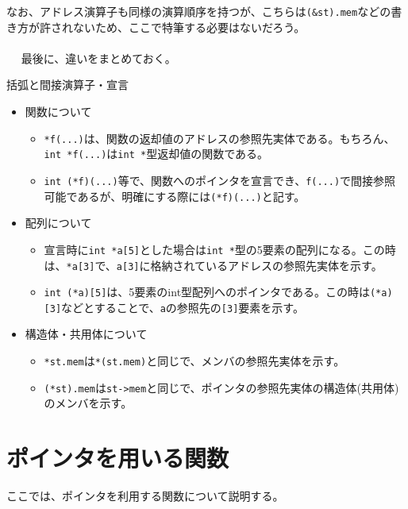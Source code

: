 なお、アドレス演算子も同様の演算順序を持つが、こちらは\verb|(&st).mem|などの書き方が許されないため、ここで特筆する必要はないだろう。
\\ \\　
最後に、違いをまとめておく。
\begin{itembox}[l]{括弧と間接演算子・宣言}
\begin{itemize}
\item 関数について
\begin{itemize}
\item \verb|*f(...)|は、関数の返却値のアドレスの参照先実体である。もちろん、\verb|int *f(...)|は\verb|int *|型返却値の関数である。
\item \verb|int (*f)(...)|等で、関数へのポインタを宣言でき、\verb|f(...)|で間接参照可能であるが、明確にする際には\verb|(*f)(...)|と記す。\\
\end{itemize}
\item 配列について
\begin{itemize}
\item 宣言時に\verb|int *a[5]|とした場合は\verb|int *|型の5要素の配列になる。この時は、\verb|*a[3]|で、\verb|a[3]|に格納されているアドレスの参照先実体を示す。
\item \verb|int (*a)[5]|は、5要素のint型配列へのポインタである。この時は\verb|(*a)[3]|などとすることで、\verb|a|の参照先の\verb|[3]|要素を示す。\\
\end{itemize}
\item 構造体・共用体について
\begin{itemize}
\item \verb|*st.mem|は\verb|*(st.mem)|と同じで、メンバの参照先実体を示す。
\item \verb|(*st).mem|は\verb|st->mem|と同じで、ポインタの参照先実体の構造体(共用体)のメンバを示す。
\end{itemize}
\end{itemize}
\end{itembox}

\section{ポインタを用いる関数}
ここでは、ポインタを利用する関数について説明する。

